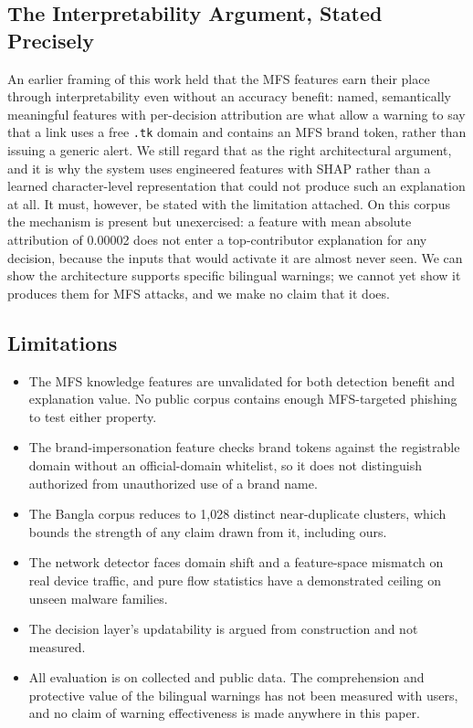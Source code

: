 \documentclass[manuscript,screen,review]{acmart}
\begin{document}
\subsection{The Interpretability Argument, Stated Precisely}
An earlier framing of this work held that the MFS features earn their place through interpretability even without an accuracy benefit: named, semantically meaningful features with per-decision attribution are what allow a warning to say that a link uses a free \texttt{.tk} domain and contains an MFS brand token, rather than issuing a generic alert. We still regard that as the right architectural argument, and it is why the system uses engineered features with SHAP rather than a learned character-level representation that could not produce such an explanation at all. It must, however, be stated with the limitation attached. On this corpus the mechanism is present but unexercised: a feature with mean absolute attribution of 0.00002 does not enter a top-contributor explanation for any decision, because the inputs that would activate it are almost never seen. We can show the architecture supports specific bilingual warnings; we cannot yet show it produces them for MFS attacks, and we make no claim that it does.

\subsection{Limitations}
\begin{itemize}
\item The MFS knowledge features are unvalidated for both detection benefit and explanation value. No public corpus contains enough MFS-targeted phishing to test either property.
\item The brand-impersonation feature checks brand tokens against the registrable domain without an official-domain whitelist, so it does not distinguish authorized from unauthorized use of a brand name.
\item The Bangla corpus reduces to 1{,}028 distinct near-duplicate clusters, which bounds the strength of any claim drawn from it, including ours.
\item The network detector faces domain shift and a feature-space mismatch on real device traffic, and pure flow statistics have a demonstrated ceiling on unseen malware families.
\item The decision layer's updatability is argued from construction and not measured.
\item All evaluation is on collected and public data. The comprehension and protective value of the bilingual warnings has not been measured with users, and no claim of warning effectiveness is made anywhere in this paper.
\end{itemize}
\end{document}
